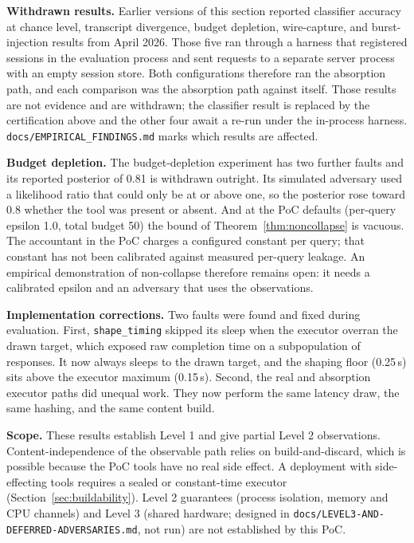 \documentclass[11pt,a4paper]{article}
\begin{document}
\textbf{Withdrawn results.} Earlier versions of this section reported classifier accuracy at chance level, transcript divergence, budget depletion, wire-capture, and burst-injection results from April 2026. Those five ran through a harness that registered sessions in the evaluation process and sent requests to a separate server process with an empty session store. Both configurations therefore ran the absorption path, and each comparison was the absorption path against itself. Those results are not evidence and are withdrawn; the classifier result is replaced by the certification above and the other four await a re-run under the in-process harness. \texttt{docs/EMPIRICAL\_FINDINGS.md} marks which results are affected.

\textbf{Budget depletion.} The budget-depletion experiment has two further faults and its reported posterior of 0.81 is withdrawn outright. Its simulated adversary used a likelihood ratio that could only be at or above one, so the posterior rose toward 0.8 whether the tool was present or absent. And at the PoC defaults (per-query epsilon 1.0, total budget 50) the bound of Theorem~\ref{thm:noncollapse} is vacuous. The accountant in the PoC charges a configured constant per query; that constant has not been calibrated against measured per-query leakage. An empirical demonstration of non-collapse therefore remains open: it needs a calibrated epsilon and an adversary that uses the observations.

\textbf{Implementation corrections.} Two faults were found and fixed during evaluation. First, \texttt{shape\_timing} skipped its sleep when the executor overran the drawn target, which exposed raw completion time on a subpopulation of responses. It now always sleeps to the drawn target, and the shaping floor (0.25\,s) sits above the executor maximum (0.15\,s). Second, the real and absorption executor paths did unequal work. They now perform the same latency draw, the same hashing, and the same content build.

\textbf{Scope.} These results establish Level 1 and give partial Level 2 observations. Content-independence of the observable path relies on build-and-discard, which is possible because the PoC tools have no real side effect. A deployment with side-effecting tools requires a sealed or constant-time executor (Section~\ref{sec:buildability}). Level 2 guarantees (process isolation, memory and CPU channels) and Level 3 (shared hardware; designed in \texttt{docs/LEVEL3-AND-DEFERRED-ADVERSARIES.md}, not run) are not established by this PoC.
\end{document}
